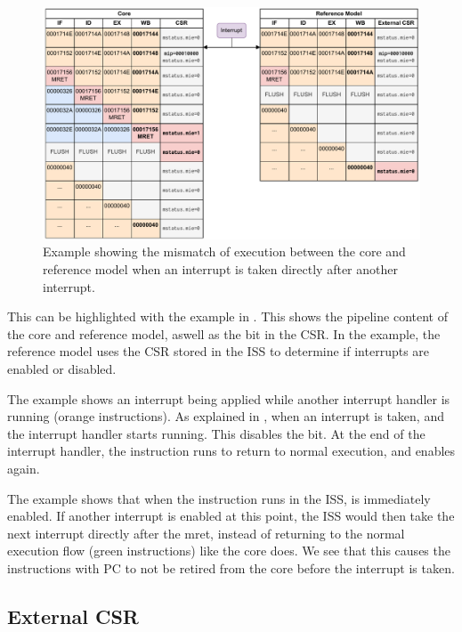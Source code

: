 \begin{figure}
    \centering
    \includegraphics[width=1\linewidth]{figures/mret_example_fail.pdf}
    \caption{Example showing the mismatch of execution between the core and reference model when an interrupt is taken directly after another interrupt.}
    \label{fig:mret_example_fail}
\end{figure}


This can be highlighted with the example in . This shows the pipeline content of the core and reference model, aswell as the  bit in the  CSR. In the example, the reference model uses the CSR stored in the ISS to determine if interrupts are enabled or disabled.

The example shows an interrupt being applied while another interrupt handler is running (orange instructions). As explained in , when an interrupt is taken, and the interrupt handler starts running. This disables the  bit. At the end of the interrupt handler, the  instruction runs to return to normal execution, and enables  again. 


The example shows that when the  instruction runs in the ISS,  is immediately enabled. If another interrupt is enabled at this point, the ISS would then take the next interrupt directly after the mret, instead of returning to the normal execution flow (green instructions) like the core does. We see that this causes the instructions with PC  to not be retired from the core before the interrupt is taken.


\subsection{External CSR}

